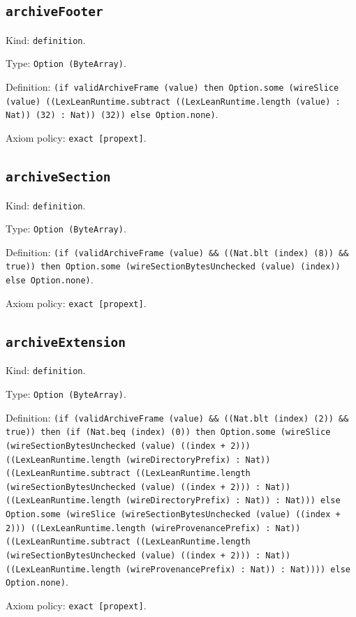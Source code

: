 \documentclass[11pt]{article}
\begin{document}
\subsection*{\texttt{archiveFooter}}
\noindent Kind: \texttt{definition}.\par
\noindent Type: \texttt{Option (ByteArray)}.\par
\noindent Definition: \texttt{(if validArchiveFrame (value) then Option.some (wireSlice (value) ((LexLeanRuntime.subtract ((LexLeanRuntime.length (value) : Nat)) (32) : Nat)) (32)) else Option.none)}.\par
\noindent Axiom policy: \texttt{exact [propext]}.\par
\subsection*{\texttt{archiveSection}}
\noindent Kind: \texttt{definition}.\par
\noindent Type: \texttt{Option (ByteArray)}.\par
\noindent Definition: \texttt{(if (validArchiveFrame (value) \&\& ((Nat.blt (index) (8)) \&\& true)) then Option.some (wireSectionBytesUnchecked (value) (index)) else Option.none)}.\par
\noindent Axiom policy: \texttt{exact [propext]}.\par
\subsection*{\texttt{archiveExtension}}
\noindent Kind: \texttt{definition}.\par
\noindent Type: \texttt{Option (ByteArray)}.\par
\noindent Definition: \texttt{(if (validArchiveFrame (value) \&\& ((Nat.blt (index) (2)) \&\& true)) then (if (Nat.beq (index) (0)) then Option.some (wireSlice (wireSectionBytesUnchecked (value) ((index + 2))) ((LexLeanRuntime.length (wireDirectoryPrefix) : Nat)) ((LexLeanRuntime.subtract ((LexLeanRuntime.length (wireSectionBytesUnchecked (value) ((index + 2))) : Nat)) ((LexLeanRuntime.length (wireDirectoryPrefix) : Nat)) : Nat))) else Option.some (wireSlice (wireSectionBytesUnchecked (value) ((index + 2))) ((LexLeanRuntime.length (wireProvenancePrefix) : Nat)) ((LexLeanRuntime.subtract ((LexLeanRuntime.length (wireSectionBytesUnchecked (value) ((index + 2))) : Nat)) ((LexLeanRuntime.length (wireProvenancePrefix) : Nat)) : Nat)))) else Option.none)}.\par
\noindent Axiom policy: \texttt{exact [propext]}.\par
\end{document}
